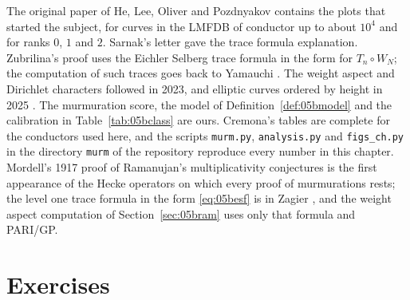 The original paper of He, Lee, Oliver and Pozdnyakov \cite{hlop2022} contains the plots that started the subject, for curves in the LMFDB of conductor up to about $10^4$ and for ranks $0$, $1$ and $2$. Sarnak's letter \cite{sarnakletter2023} gave the trace formula explanation. Zubrilina's proof \cite{zubrilina2023} uses the Eichler Selberg trace formula in the form for $T_n\circ W_N$; the computation of such traces goes back to Yamauchi \cite{yamauchi1973}. The weight aspect \cite{bbllp2023} and Dirichlet characters \cite{lop2023} followed in 2023, and elliptic curves ordered by height in 2025 \cite{sawinsutherland2025}. The murmuration score, the model of Definition~\ref{def:05bmodel} and the calibration in Table~\ref{tab:05bclass} are ours. Cremona's tables \cite{cremonaecdata} are complete for the conductors used here, and the scripts \texttt{murm.py}, \texttt{analysis.py} and \texttt{figs\_ch.py} in the directory \texttt{murm} of the repository reproduce every number in this chapter. Mordell's 1917 proof \cite{mordell1917} of Ramanujan's multiplicativity conjectures \cite{ramanujan1916} is the first appearance of the Hecke operators on which every proof of murmurations rests; the level one trace formula in the form \eqref{eq:05besf} is in Zagier \cite{zagier1977}, and the weight aspect computation of Section~\ref{sec:05bram} uses only that formula and PARI/GP.

\section{Exercises}

